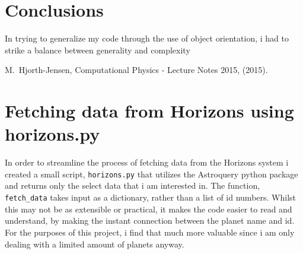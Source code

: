 \documentclass[10pt,showpacs,preprintnumbers,footinbib,amsmath,amssymb,aps,prl,twocolumn,groupedaddress,superscriptaddress,showkeys]{revtex4-1}
\begin{document}
\section{Conclusions}
  In trying to generalize my code through the use of object orientation, i had to strike a balance between generality and complexity

\begin{thebibliography}{99}
 M.~Hjorth-Jensen, Computational Physics - Lecture Notes 2015, (2015).
\end{thebibliography}

\appendix
\section{Fetching data from Horizons using horizons.py}
  In order to streamline the process of fetching data from the Horizons system i created a small script, \lstinline{horizons.py} that utilizes the Astroquery python package and returns only the select data that i am interested in. The function, \lstinline{fetch_data} takes input as a dictionary, rather than a list of id numbers. Whilst this may not be as extensible or practical, it makes the code easier to read and understand, by making the instant connection between the planet name and id. For the purposes of this project, i find that much more valuable since i am only dealing with a limited amount of planets anyway.
\end{document}
